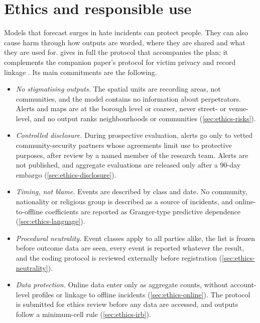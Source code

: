 \section{Ethics and responsible use}\label{sec:ethics}

Models that forecast surges in hate incidents can protect people. They can also cause
harm through how outputs are worded, where they are shared and what they are used for.
 gives in full the protocol that accompanies the plan; it complements
the companion paper's protocol for victim privacy and record linkage
\citep{kornsteinlab2026darkfigure}. Its main commitments are the following.
\begin{itemize}
  \item \emph{No stigmatising outputs.} The spatial units are recording areas, not
  communities, and the model contains no information about perpetrators. Alerts and maps
  are at the borough level or coarser, never street- or venue-level, and no output ranks
  neighbourhoods or communities (\cref{sec:ethics-risks}).
  \item \emph{Controlled disclosure.} During prospective evaluation, alerts go only to
  vetted community-security partners whose agreements limit use to protective purposes,
  after review by a named member of the research team. Alerts are not published, and
  aggregate evaluations are released only after a 90-day embargo
  (\cref{sec:ethics-disclosure}).
  \item \emph{Timing, not blame.} Events are described by class and date. No community,
  nationality or religious group is described as a source of incidents, and
  online-to-offline coefficients are reported as Granger-type predictive dependence
  (\cref{sec:ethics-language}).
  \item \emph{Procedural neutrality.} Event classes apply to all parties alike, the list is
  frozen before outcome data are seen, every event is reported whatever the result, and the
  coding protocol is reviewed externally before registration
  (\cref{sec:ethics-neutrality}).
  \item \emph{Data protection.} Online data enter only as aggregate counts, without
  account-level profiles or linkage to offline incidents (\cref{sec:ethics-online}). The
  protocol is submitted for ethics review before any data are accessed, and outputs follow
  a minimum-cell rule (\cref{sec:ethics-irb}).
\end{itemize}
